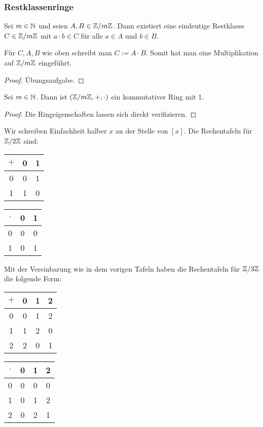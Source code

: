 \subsubsection{Restklassenringe}

\begin{propn}
	Sei $ m \in \mathbb N $ und seien $ A,B \in \mathbb Z/m\mathbb Z $. Dann existiert eine eindeutige Restklasse $ C \in \mathbb Z/m\mathbb Z $ mit $ a \cdot b \in C $ für alle $ a \in A $ und $ b \in B $.
	
	Für $ C, A, B $ wie oben schreibt man $ C := A \cdot B $. Somit hat man eine Multiplikation auf $ \mathbb Z/m\mathbb Z $ eingeführt.
\end{propn}
\begin{proof}
	Übungsaufgabe.
\end{proof}

\begin{propn}
	Sei $ m \in \mathbb N $. Dann ist $ ( \mathbb Z/m\mathbb Z, +, \cdot ) $ ein kommutativer Ring mit 1.
\end{propn}
\begin{proof}
	Die Ringeigenschaften lassen sich direkt verifizieren. 
\end{proof}

\begin{bsp}[$ \Z/2\Z $]
	Wir schreiben Einfachheit halber $x$ an der Stelle von $[x]$. Die Rechentafeln für $\Z / 2 \Z$ sind: 
	\begin{center} 
	\begin{tabular}{c|cc}
		$ + $ & 0 & 1 \\
		\hline
		0 & 0 & 1 \\
		1 & 1 & 0
	\end{tabular}
	\quad\quad\quad 
	\begin{tabular}{c|cc}
		$ \cdot $ & 0 & 1 \\
		\hline
		0 & 0 & 0 \\
		1 & 0 & 1
	\end{tabular}
	\end{center} 
\end{bsp}
\begin{bsp}[$ \Z/3\Z $]
	Mit der Vereinbarung wie in dem vorigen Tafeln haben die Rechentafeln für $\Z / 3 \Z$ die folgende Form: 
	\begin{center} 
	\begin{tabular}{c|ccc}
		$ + $ & 0 & 1 & 2 \\
		\hline
		0 & 0 & 1 & 2 \\
		1 & 1 & 2 & 0 \\
		2 & 2 & 0 & 1
	\end{tabular}
	\quad\quad\quad 
	\begin{tabular}{c|ccc}
		$ \cdot $ & 0 & 1 & 2 \\
		\hline
		0 & 0 & 0 & 0 \\
		1 & 0 & 1 & 2 \\
		2 & 0 & 2 & 1
	\end{tabular}
	\end{center} 
\end{bsp}

